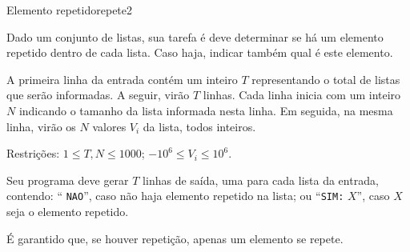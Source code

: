 \documentclass[12pt,a4paper,oneside]{article}
\begin{document}
\begin{problem}{Elemento repetido}{repete}{2}
 
Dado um conjunto de listas, sua tarefa é deve determinar se há um elemento
repetido dentro de cada lista. Caso haja, indicar também qual é este elemento.

%

\InputFile

A primeira linha da entrada contém um inteiro $T$ representando o total de listas que serão informadas. A seguir, virão $T$ linhas. Cada linha
inicia com um inteiro $N$ indicando o tamanho da lista informada nesta linha. Em seguida, na mesma linha, virão os $N$ valores $V_i$ da lista, todos inteiros.

Restrições: $1 \leq T, N \leq 1000$; $-10^6 \leq V_i \leq 10^6$.

\OutputFile

Seu programa deve gerar $T$ linhas de saída, uma para cada lista da entrada, contendo: `` \texttt{NAO}'', caso não haja elemento repetido na lista; ou ``\texttt{SIM:} $X$'', caso $X$ seja o elemento repetido. 

É garantido que, se houver repetição, apenas um elemento se repete.


\Example

\begin{example}
%
\end{example}


\end{problem}
\end{document}
